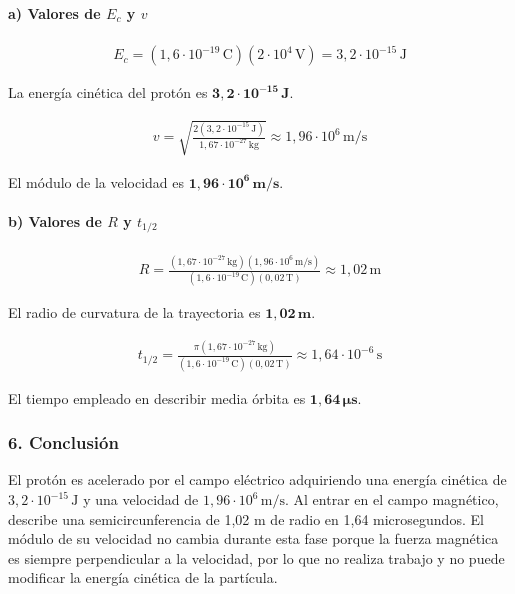\paragraph*{a) Valores de $E_c$ y $v$}
\begin{gather}
    E_c = (1,6 \cdot 10^{-19} \, \text{C})(2 \cdot 10^4 \, \text{V}) = 3,2 \cdot 10^{-15} \, \text{J}
\end{gather}
\begin{cajaresultado}
    La energía cinética del protón es $\boldsymbol{3,2 \cdot 10^{-15} \, \textbf{J}}$.
\end{cajaresultado}
\begin{gather}
    v = \sqrt{\frac{2 (3,2 \cdot 10^{-15} \, \text{J})}{1,67 \cdot 10^{-27} \, \text{kg}}} \approx 1,96 \cdot 10^6 \, \text{m/s}
\end{gather}
\begin{cajaresultado}
    El módulo de la velocidad es $\boldsymbol{1,96 \cdot 10^6 \, \textbf{m/s}}$.
\end{cajaresultado}

\paragraph*{b) Valores de $R$ y $t_{1/2}$}
\begin{gather}
    R = \frac{(1,67 \cdot 10^{-27} \, \text{kg})(1,96 \cdot 10^6 \, \text{m/s})}{(1,6 \cdot 10^{-19} \, \text{C})(0,02 \, \text{T})} \approx 1,02 \, \text{m}
\end{gather}
\begin{cajaresultado}
    El radio de curvatura de la trayectoria es $\boldsymbol{1,02 \, \textbf{m}}$.
\end{cajaresultado}
\begin{gather}
    t_{1/2} = \frac{\pi (1,67 \cdot 10^{-27} \, \text{kg})}{(1,6 \cdot 10^{-19} \, \text{C})(0,02 \, \text{T})} \approx 1,64 \cdot 10^{-6} \, \text{s}
\end{gather}
\begin{cajaresultado}
    El tiempo empleado en describir media órbita es $\boldsymbol{1,64 \, \mu\textbf{s}}$.
\end{cajaresultado}

\subsubsection*{6. Conclusión}
\begin{cajaconclusion}
    El protón es acelerado por el campo eléctrico adquiriendo una energía cinética de $3,2 \cdot 10^{-15} \, \text{J}$ y una velocidad de $1,96 \cdot 10^6 \, \text{m/s}$. Al entrar en el campo magnético, describe una semicircunferencia de 1,02 m de radio en 1,64 microsegundos. El módulo de su velocidad no cambia durante esta fase porque la fuerza magnética es siempre perpendicular a la velocidad, por lo que no realiza trabajo y no puede modificar la energía cinética de la partícula.
\end{cajaconclusion}

